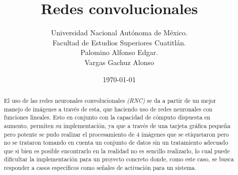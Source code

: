 \documentclass[a4paper, 12pt]{article}
\title{Redes convolucionales}
\author{Universidad Nacional Autónoma de México.\\Facultad de Estudios Superiores Cuatitlán.\\Palomino Alfonso Edgar.\\Vargas Gachuz Alonso}
\date{\today}
\begin{document}
    \maketitle 
    \begin{abstract}      
        El uso de las redes neuronales convolucionales \emph{(RNC)} se da a partir de un mejor manejo de imágenes a través de esta, que haciendo uso de redes neuronales con funciones lineales. Esto en conjunto con la capacidad de cómputo dispuesta en aumento, permiten su implementación, ya que a través de una tarjeta gráfica pequeña pero potente se pudo realizar el procesamiento de 4 imágenes que se etiquetaron pero no se trataron tomando en cuenta un conjunto de datos sin un tratamiento adecuado que si bien es posible encontrarlo en la realidad no es sencillo realizarlo, lo cual puede dificultar la implementación para un proyecto concreto donde, como este caso, se busca responder a casos específicos como señales de activación para un sistema. 
    \end{abstract} 
    \vspace{2ex}
\end{document}
